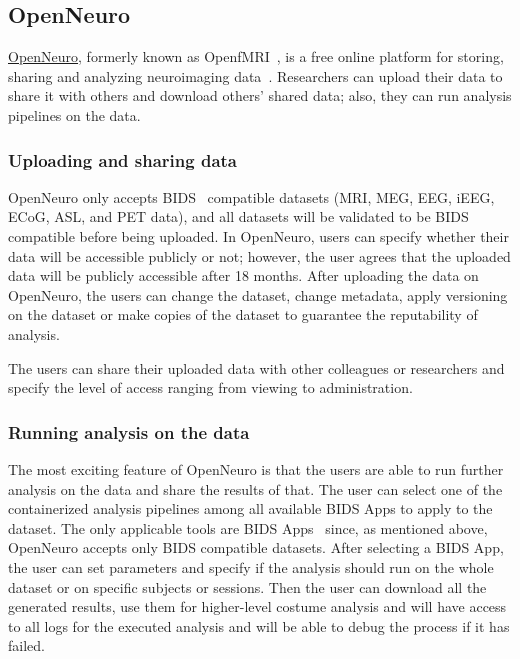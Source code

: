 \subsection{OpenNeuro}
\href{https://openneuro.org}{OpenNeuro}, formerly known as OpenfMRI~\cite{poldrack2017openfmri}, is a free online platform for storing, sharing and analyzing neuroimaging data~\cite{gorgolewski2017openneuro}. Researchers can upload their data to share it with others and download others' shared data; also, they can run analysis pipelines on the data. 

\subsubsection{Uploading and sharing data}
 OpenNeuro only accepts BIDS~\cite{gorgolewski2016brain}  compatible datasets (MRI, MEG, EEG, iEEG, ECoG, ASL, and PET data), and all datasets will be validated to be BIDS compatible before being uploaded. In OpenNeuro, users can specify whether their data will be accessible publicly or not; however, the user agrees that the uploaded data will be publicly accessible after 18 months. After uploading the data on OpenNeuro, the users can change the dataset, change metadata, apply versioning on the dataset or make copies of the dataset to guarantee the reputability of analysis. 
 
 The users can share their uploaded data with other colleagues or researchers and specify the level of access ranging from viewing to administration. 

\subsubsection{Running analysis on the data }
The most exciting feature of OpenNeuro is that the users are able to run further analysis on the data and share the results of that. The user can select one of the containerized analysis pipelines among all available BIDS Apps to apply to the dataset. The only applicable tools are BIDS Apps~\cite{gorgolewski2017bids} since, as mentioned above, OpenNeuro accepts only BIDS compatible datasets. After selecting a BIDS App, the user can set parameters and specify if the analysis should run on the whole dataset or on specific subjects or sessions. Then the user can download all the generated results, use them for higher-level costume analysis and will have access to all logs for the executed analysis and will be able to debug the process if it has failed.


